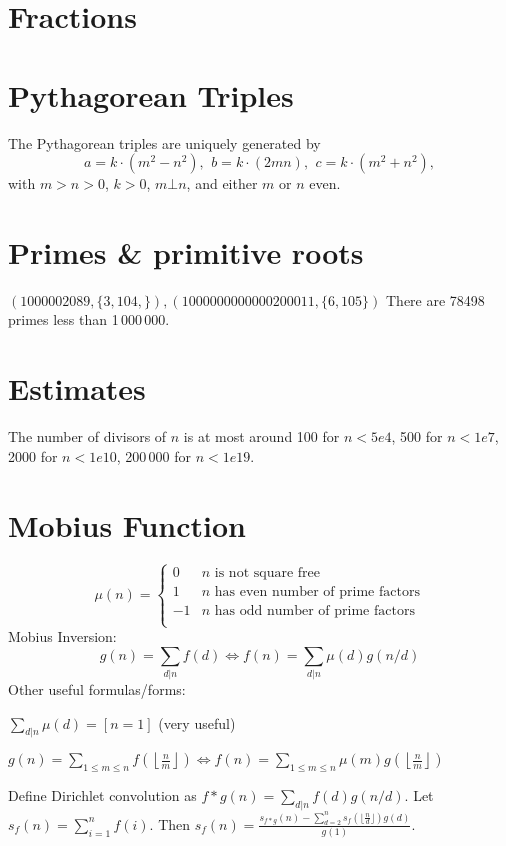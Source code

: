 \section{Fractions}

\section{Pythagorean Triples}
 The Pythagorean triples are uniquely generated by
 \[ a=k\cdot (m^{2}-n^{2}),\ \,b=k\cdot (2mn),\ \,c=k\cdot (m^{2}+n^{2}), \]
 with $m > n > 0$, $k > 0$, $m \bot n$, and either $m$ or $n$ even.

\section{Primes \& primitive roots}
	$(1000002089, \{3, 104, \}), (1000000000000200011, \{6, 105\})$
	There are 78498 primes less than 1\,000\,000.


\section{Estimates}

	The number of divisors of $n$ is at most around 100 for $n < 5e4$, 500 for $n < 1e7$, 2000 for $n < 1e10$, 200\,000 for $n < 1e19$.

\section{Mobius Function}
\[
	\mu(n) = \begin{cases} 0 & n \textrm{ is not square free}\\ 1 & n \textrm{ has even number of prime factors}\\ -1 & n \textrm{ has odd number of prime factors}\\\end{cases}
\]
  Mobius Inversion:
  \[ g(n) = \sum_{d|n} f(d) \Leftrightarrow f(n) = \sum_{d|n} \mu(d)g(n/d) \]
  Other useful formulas/forms:

  $ \sum_{d | n} \mu(d) = [ n = 1] $ (very useful)

 $ g(n) = \sum_{1 \leq m \leq n} f(\left\lfloor\frac{n}{m}\right \rfloor ) \Leftrightarrow f(n) = \sum_{1\leq m\leq n} \mu(m)g(\left\lfloor\frac{n}{m}\right\rfloor)$

  Define Dirichlet convolution as $f * g(n) = \sum_{d|n}f(d)g(n/d)$.
  Let $s_f(n) = \sum_{i=1}^n{f(i)}$.
  Then $s_f(n) = \frac{s_{f*g}(n) - \sum^n_{d=2}s_f(\lfloor \frac{n}{d} \rfloor) g(d)}{g(1)}$.
